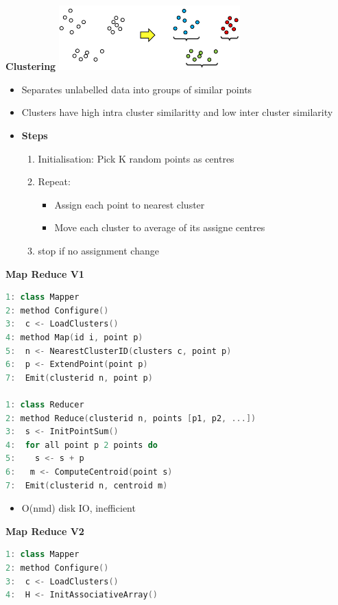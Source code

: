 \documentclass[10pt, landscape]{article}
\begin{document}
\begin{multicols}{4}
\textbf{Clustering}
\includegraphics*[width=7cm]{clustering.png}
\begin{itemize}
  \item Separates unlabelled data into groups of similar points 
  \item Clusters have high intra cluster similaritty and low inter cluster similarity
  \item \textbf{Steps}
  \begin{enumerate}
    \item Initialisation: Pick K random points as centres 
    \item Repeat: 
    \begin{itemize}
      \item Assign each point to nearest cluster 
      \item Move each cluster to average of its assigne centres 
    \end{itemize}
    \item stop if no assignment change 
  \end{enumerate}
\end{itemize}

\textbf{Map Reduce V1}
\begin{lstlisting}[language=C++, breaklines=true, breakatwhitespace=true]
1: class Mapper
2: method Configure()
3:  c <- LoadClusters()
4: method Map(id i, point p)
5:  n <- NearestClusterID(clusters c, point p)
6:  p <- ExtendPoint(point p)
7:  Emit(clusterid n, point p)

1: class Reducer
2: method Reduce(clusterid n, points [p1, p2, ...])
3:  s <- InitPointSum()
4:  for all point p 2 points do
5:    s <- s + p
6:   m <- ComputeCentroid(point s)
7:  Emit(clusterid n, centroid m)
\end{lstlisting}  
\begin{itemize}
  \item O(nmd) disk IO, inefficient
\end{itemize}

\textbf{Map Reduce V2}
\begin{lstlisting}[language=C++, breaklines=true, breakatwhitespace=true]
1: class Mapper
2: method Configure()
3:  c <- LoadClusters()
4:  H <- InitAssociativeArray()


\end{lstlisting}
\end{multicols}
\end{document}
